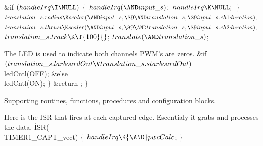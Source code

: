 \Y\B\&{if} ${}(\\{handleIrq}\I\NULL){}$\5
${}\{{}$\1\7
${}\\{handleIrq}({\AND}\\{input\_s});{}$\6
${}\\{handleIrq}\K\NULL;{}$\6
\4${}\}{}$\2\6
${}\\{translation\_s}.\\{radius}\K\\{scaler}({\AND}\\{input\_s},\39{\AND}%
\\{translation\_s},\39\\{input\_s}.\\{ch1duration});{}$\6
${}\\{translation\_s}.\\{thrust}\K\\{scaler}({\AND}\\{input\_s},\39{\AND}%
\\{translation\_s},\39\\{input\_s}.\\{ch2duration});{}$\6
${}\\{translation\_s}.\\{track}\K\T{100}{}$;\6
${}\\{translate}({\AND}\\{translation\_s}){}$;\par
\fi

The LED is used to indicate both channels PWM's are zeros.
\Y\B\&{if} ${}(\\{translation\_s}.\\{larboardOut}\V\\{translation\_s}.%
\\{starboardOut}){}$\1\5
\\{ledCntl}(\.{OFF});\2\6
\&{else}\1\5
\\{ledCntl}(\.{ON});\2\7
$\}{}$\7
\&{return} ;\7
$\}{}$\par
\fi

Supporting routines, functions, procedures and configuration
blocks.


\fi

Here is the ISR that fires at each captured edge.
Escentialy it grabs and processes the  data.
\Y\B\.{ISR}(\\{TIMER1\_CAPT\_vect})\7
${}\{{}$\1\7
${}\\{handleIrq}\K{\AND}\\{pwcCalc}{}$;\7
\4${}\}{}$\2\Y\par
\fi

